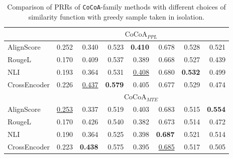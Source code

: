 \begin{table*}[th!]
\begin{tabular}{lrrrrrrr}
\midrule

& \multicolumn{7}{c}{$\text{CoCoA}_{PPL}$}\\
\midrule

AlignScore & 0.252& 0.340& 0.523& \textbf{0.410}& 0.678& 0.528& 0.521\\
RougeL & 0.170& 0.409& 0.537& 0.389& 0.668& 0.527& 0.439\\
NLI & 0.193& 0.364& 0.531& \underline{0.408}& 0.680& \textbf{0.532}& 0.499\\
CrossEncoder & 0.226& \underline{0.437}& \textbf{0.579}& 0.405& 0.677& 0.529& 0.474\\

\midrule

& \multicolumn{7}{c}{$\text{CoCoA}_{MTE}$}\\
\midrule

AlignScore & \underline{0.253}& 0.337& 0.519& 0.403& 0.683& 0.515& \textbf{0.554}\\
RougeL & 0.170& 0.426& 0.540& 0.382& 0.673& 0.514& 0.472\\
NLI & 0.190& 0.364& 0.525& 0.398& \textbf{0.687}& 0.521& 0.514\\
CrossEncoder & 0.223& \textbf{0.438}& 0.575& 0.395& \underline{0.685}& 0.517& 0.505\\
\bottomrule

\end{tabular}
\caption{Comparison of PRRs of \texttt{CoCoA}-family methods with different choices of similarity function with greedy sample taken in isolation.}
\label{suppl:ablation_sim_mat_greedy}
\end{table*}
